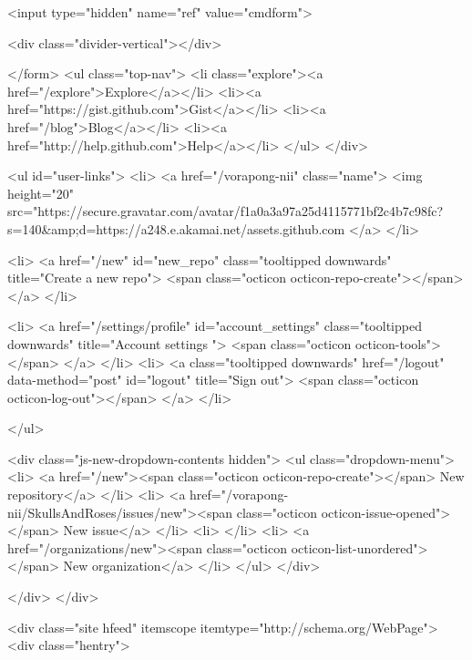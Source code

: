   <input type="hidden" name="ref" value="cmdform">

  <div class="divider-vertical"></div>

</form>
        <ul class="top-nav">
            <li class="explore"><a href="/explore">Explore</a></li>
            <li><a href="https://gist.github.com">Gist</a></li>
            <li><a href="/blog">Blog</a></li>
          <li><a href="http://help.github.com">Help</a></li>
        </ul>
      </div>

    

  

    <ul id="user-links">
      <li>
        <a href="/vorapong-nii" class="name">
          <img height="20" src="https://secure.gravatar.com/avatar/f1a0a3a97a25d4115771bf2c4b7c98fc?s=140&amp;d=https://a248.e.akamai.net/assets.github.com%
        </a>
      </li>

        <li>
          <a href="/new" id="new_repo" class="tooltipped downwards" title="Create a new repo">
            <span class="octicon octicon-repo-create"></span>
          </a>
        </li>

        <li>
          <a href="/settings/profile" id="account_settings"
            class="tooltipped downwards"
            title="Account settings ">
            <span class="octicon octicon-tools"></span>
          </a>
        </li>
        <li>
          <a class="tooltipped downwards" href="/logout" data-method="post" id="logout" title="Sign out">
            <span class="octicon octicon-log-out"></span>
          </a>
        </li>

    </ul>


<div class="js-new-dropdown-contents hidden">
  <ul class="dropdown-menu">
    <li>
      <a href="/new"><span class="octicon octicon-repo-create"></span> New repository</a>
    </li>
    <li>
        <a href="/vorapong-nii/SkullsAndRoses/issues/new"><span class="octicon octicon-issue-opened"></span> New issue</a>
    </li>
    <li>
    </li>
    <li>
      <a href="/organizations/new"><span class="octicon octicon-list-unordered"></span> New organization</a>
    </li>
  </ul>
</div>


    
  </div>
</div>

      

      


            <div class="site hfeed" itemscope itemtype="http://schema.org/WebPage">
      <div class="hentry">
        
